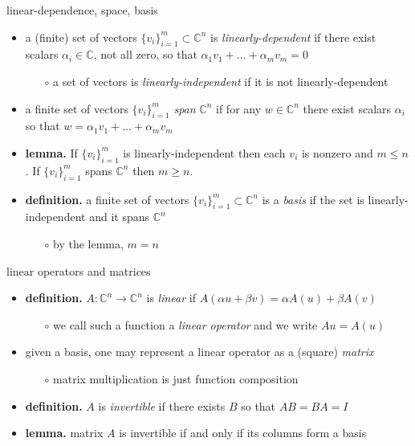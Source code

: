 \documentclass[10pt,hyperref]{beamer}
\newcommand{\CC}{\mathbb{C}}
\begin{document}
\begin{frame}{linear-dependence, space, basis}

\begin{itemize}
\item a (finite) set of vectors $\{v_i\}_{i=1}^m \subset \CC^n$ is \emph{linearly-dependent} if there exist scalars $\alpha_i \in \CC$, not all zero, so that $\alpha_1 v_1 + \dots + \alpha_m v_m = 0$
    \begin{itemize}
    \item[$\circ$] a set of vectors is \emph{linearly-independent} if it is not linearly-dependent
    \end{itemize}
\item a finite set of vectors $\{v_i\}_{i=1}^m$ \emph{span} $\CC^n$ if for any $w\in \CC^n$ there exist scalars $\alpha_i$ so that $w = \alpha_1 v_1 + \dots + \alpha_m v_m$
\item \textbf{lemma.}  If $\{v_i\}_{i=1}^m$ is linearly-independent then each $v_i$ is nonzero and $m \le n$.  If $\{v_i\}_{i=1}^m$ spans $\CC^n$ then $m \ge n$.
\item \textbf{definition.} a finite set of vectors $\{v_i\}_{i=1}^m \subset \CC^n$ is a \emph{basis} if the set is linearly-independent and it spans $\CC^n$
    \begin{itemize}
    \item[$\circ$] by the lemma, $m=n$
    \end{itemize}
\end{itemize}
\end{frame}


\begin{frame}{linear operators and matrices}

\begin{itemize}
\item \textbf{definition.}  $A:\CC^n \to \CC^n$ is \emph{linear} if $A(\alpha u+\beta v) = \alpha A(u) + \beta A(v)$
    \begin{itemize}
    \item[$\circ$] we call such a function a \emph{linear operator} and we write $Au=A(u)$
    \end{itemize}
\item given a basis, one may represent a linear operator as a (square) \emph{matrix}
    \begin{itemize}
    \item[$\circ$] matrix multiplication is just function composition
    \end{itemize}
\item \textbf{definition.} $A$ is \emph{invertible} if there exists $B$ so that $AB=BA=I$
\item \textbf{lemma.} matrix $A$ is invertible if and only if its columns form a basis
\end{itemize}
\end{frame}
\end{document}
